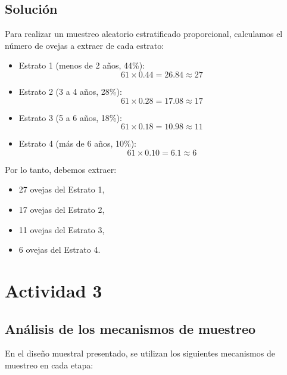 \documentclass[12pt, letterpaper]{article}
\begin{document}
        \subsection{Solución} Para realizar un muestreo aleatorio estratificado proporcional, calculamos el número de ovejas a extraer de cada estrato:

            \begin{itemize}
                \item Estrato 1 (menos de 2 años, 44\%): 
                \[61 \times 0.44 = 26.84 \approx 27\]

                \item Estrato 2 (3 a 4 años, 28\%): 
                \[61 \times 0.28 = 17.08 \approx 17\]

                \item Estrato 3 (5 a 6 años, 18\%): 
                \[61 \times 0.18 = 10.98 \approx 11\]

                \item Estrato 4 (más de 6 años, 10\%): 
                \[61 \times 0.10 = 6.1 \approx 6\]
            \end{itemize}

            Por lo tanto, debemos extraer:
            \begin{itemize}
                \item 27 ovejas del Estrato 1,
                \item 17 ovejas del Estrato 2,
                \item 11 ovejas del Estrato 3,
                \item 6 ovejas del Estrato 4.
            \end{itemize}
            \newpage

    \section{Actividad 3}
        \subsection{Análisis de los mecanismos de muestreo} En el diseño muestral presentado, se utilizan los siguientes mecanismos de muestreo en cada etapa:
\end{document}
